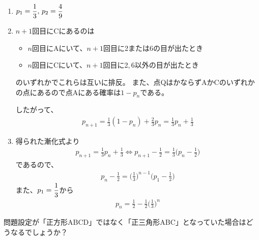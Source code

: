 \documentclass[a4paper]{ltjsarticle}
\begin{document}
\begin{ans*}
  ${}$
  \begin{enumerate}[label=(\arabic*), ref=(\arabic*), itemsep=0pt]
    \item $\displaystyle p_{1} = \frac{1}{3},\, p_{2} = \frac{4}{9}$
    \item $n+1$回目にCにあるのは
    \begin{itemize}[label=\textbullet, itemsep=0pt]
      \item $n$回目にAにいて、$n+1$回目に2または6の目が出たとき
      \item $n$回目にCにいて、$n+1$回目に2,\,6以外の目が出たとき
    \end{itemize}
    のいずれかでこれらは互いに排反。
    また、点QはかならずAかCのいずれかの点にあるので点Aにある確率は$1-p_{n}$である。

    したがって、
    \begin{gather*}
      p_{n+1} = \frac{1}{3}(1-p_{n}) + \frac{2}{3}p_{n} = \frac{1}{3}p_{n} + \frac{1}{3}
    \end{gather*}

    \item 得られた漸化式より
    \begin{gather*}
      p_{n+1} = \frac{1}{3}p_{n} + \frac{1}{3} \Longleftrightarrow
      p_{n+1} - \frac{1}{2} = \frac{1}{3}\biggl(p_{n} - \frac{1}{2}\biggr)
    \end{gather*}
    であるので、
    \begin{gather*}
      p_{n} - \frac{1}{2} = \biggl(\frac{1}{3}\biggr)^{n-1}\biggl(p_{1} - \frac{1}{2}\biggr)
    \end{gather*}
    また、$\displaystyle p_{1} = \frac{1}{3}$から
    \begin{gather*}
      p_{n} = \frac{1}{2} - \frac{1}{2} \biggl(\frac{1}{3}\biggr)^{n}
    \end{gather*}
  \end{enumerate}
\end{ans*}
\begin{supple*}
  問題設定が「正方形ABCD」ではなく「正三角形ABC」となっていた場合はどうなるでしょうか？
\end{supple*}
\end{document}
